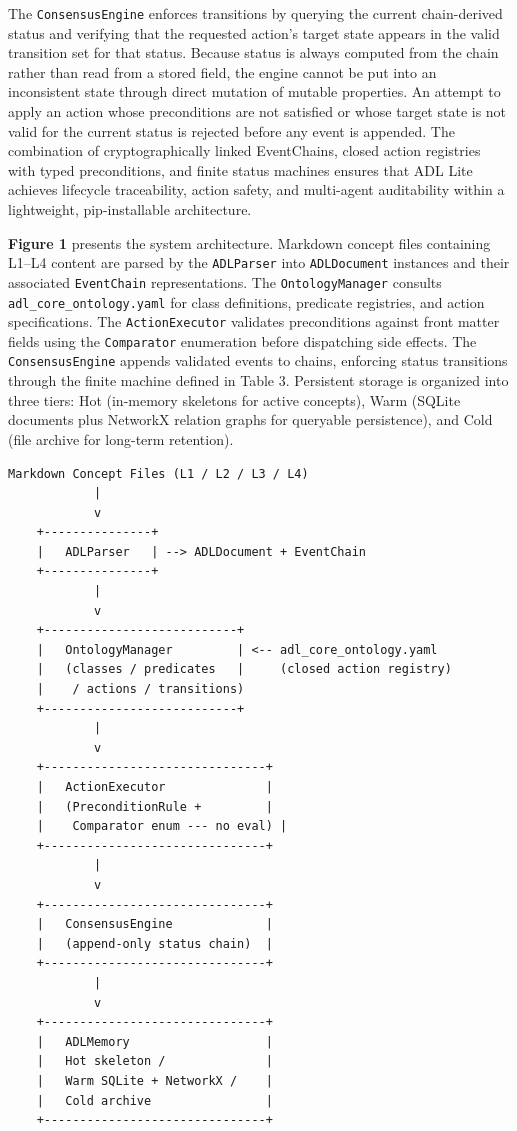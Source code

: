 The \texttt{ConsensusEngine} enforces transitions by querying the current chain-derived status and verifying that the requested action's target state appears in the valid transition set for that status. Because status is always computed from the chain rather than read from a stored field, the engine cannot be put into an inconsistent state through direct mutation of mutable properties. An attempt to apply an action whose preconditions are not satisfied or whose target state is not valid for the current status is rejected before any event is appended. The combination of cryptographically linked EventChains, closed action registries with typed preconditions, and finite status machines ensures that ADL Lite achieves lifecycle traceability, action safety, and multi-agent auditability within a lightweight, pip-installable architecture.

\textbf{Figure 1} presents the system architecture. Markdown concept files containing L1--L4 content are parsed by the \texttt{ADLParser} into \texttt{ADLDocument} instances and their associated \texttt{EventChain} representations. The \texttt{OntologyManager} consults \texttt{adl\_core\_ontology.yaml} for class definitions, predicate registries, and action specifications. The \texttt{ActionExecutor} validates preconditions against front matter fields using the \texttt{Comparator} enumeration before dispatching side effects. The \texttt{ConsensusEngine} appends validated events to chains, enforcing status transitions through the finite machine defined in Table 3. Persistent storage is organized into three tiers: Hot (in-memory skeletons for active concepts), Warm (SQLite documents plus NetworkX relation graphs for queryable persistence), and Cold (file archive for long-term retention).

\begin{verbatim}
Markdown Concept Files (L1 / L2 / L3 / L4)
            |
            v
    +---------------+
    |   ADLParser   | --> ADLDocument + EventChain
    +---------------+
            |
            v
    +---------------------------+
    |   OntologyManager         | <-- adl_core_ontology.yaml
    |   (classes / predicates   |     (closed action registry)
    |    / actions / transitions)
    +---------------------------+
            |
            v
    +-------------------------------+
    |   ActionExecutor              |
    |   (PreconditionRule +         |
    |    Comparator enum --- no eval) |
    +-------------------------------+
            |
            v
    +-------------------------------+
    |   ConsensusEngine             |
    |   (append-only status chain)  |
    +-------------------------------+
            |
            v
    +-------------------------------+
    |   ADLMemory                   |
    |   Hot skeleton /              |
    |   Warm SQLite + NetworkX /    |
    |   Cold archive                |
    +-------------------------------+
\end{verbatim}

